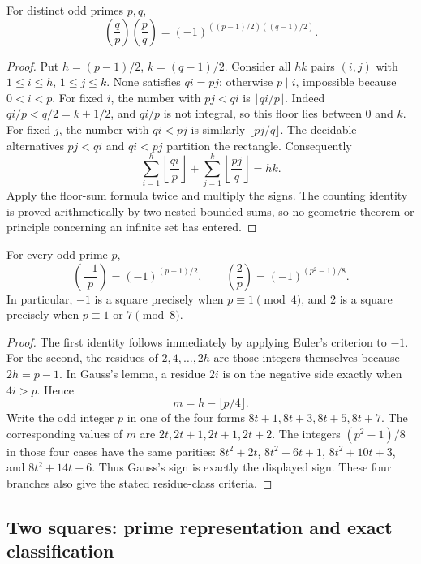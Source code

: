 \begin{theorem}\label{qr:reciprocity}
For distinct odd primes $p,q$,
\[
 \left(\frac qp\right)\left(\frac pq\right)
       =(-1)^{((p-1)/2)((q-1)/2)}.
\]
\end{theorem}
\begin{proof}
Put $h=(p-1)/2$, $k=(q-1)/2$. Consider all $hk$ pairs
$(i,j)$ with $1\le i\le h$, $1\le j\le k$. None satisfies
$qi=pj$: otherwise $p\mid i$, impossible because $0<i<p$.
For fixed $i$, the number with $pj<qi$ is $\lfloor qi/p\rfloor$.
Indeed $qi/p<q/2=k+1/2$, and $qi/p$ is not integral, so this floor
lies between $0$ and $k$. For fixed $j$, the number with $qi<pj$
is similarly $\lfloor pj/q\rfloor$. The decidable alternatives
$pj<qi$ and $qi<pj$ partition the rectangle. Consequently
\[
 \sum_{i=1}^{h}\left\lfloor\frac{qi}{p}\right\rfloor+
 \sum_{j=1}^{k}\left\lfloor\frac{pj}{q}\right\rfloor=hk.
\]
Apply the floor-sum formula twice and multiply the signs. The counting
identity is proved arithmetically by two nested bounded sums, so no
geometric theorem or principle concerning an infinite set has entered.
\end{proof}

\begin{theorem}\label{qr:supplements}
For every odd prime $p$,
\[
 \left(\frac{-1}{p}\right)=(-1)^{(p-1)/2},
 \qquad
 \left(\frac2p\right)=(-1)^{(p^2-1)/8}.
\]
In particular, $-1$ is a square precisely when $p\equiv1\pmod4$,
and $2$ is a square precisely when $p\equiv1$ or $7\pmod8$.
\end{theorem}
\begin{proof}
The first identity follows immediately by applying Euler's criterion to
$-1$. For the second, the residues of $2,4,\ldots,2h$ are those
integers themselves because $2h=p-1$. In Gauss's lemma, a residue
$2i$ is on the negative side exactly when $4i>p$. Hence
\[
 m=h-\lfloor p/4\rfloor.
\]
Write the odd integer $p$ in one of the four forms $8t+1,8t+3,8t+5,8t+7$.
The corresponding values of $m$ are $2t,2t+1,2t+1,2t+2$.
The integers $(p^2-1)/8$ in those four cases have the same parities:
$8t^2+2t$, $8t^2+6t+1$, $8t^2+10t+3$, and $8t^2+14t+6$.
Thus Gauss's sign is exactly the displayed sign. These four branches
also give the stated residue-class criteria.
\end{proof}

\subsection{Two squares: prime representation and exact classification}

